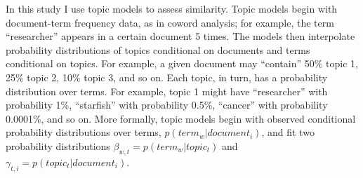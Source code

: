 \documentclass[
  11pt,
]{article}
\begin{document}
In this study I use topic models to assess similarity. Topic models begin with document-term frequency data, as in coword analysis; for example, the term ``researcher'' appears in a certain document 5 times. The models then interpolate probability distributions of topics conditional on documents and terms conditional on topics. For example, a given document may ``contain'' 50\% topic 1, 25\% topic 2, 10\% topic 3, and so on. Each topic, in turn, has a probability distribution over terms. For example, topic 1 might have ``researcher'' with probability 1\%, ``starfish'' with probability 0.5\%, ``cancer'' with probability 0.0001\%, and so on. More formally, topic models begin with observed conditional probability distributions over terms, \(p(term_w | document_i)\), and fit two probability distributions \(\beta_{w,t} = p(term_w | topic_t)\) and \(\gamma_{t,i} = p(topic_t | document_i)\).
\end{document}
